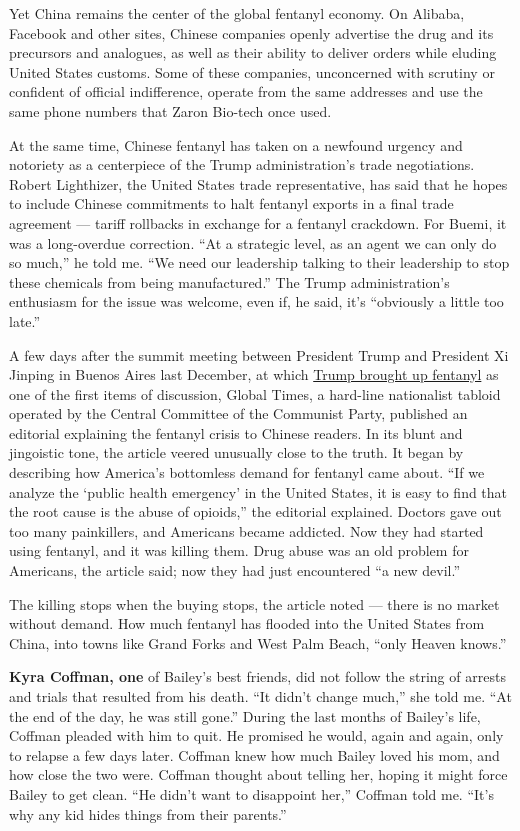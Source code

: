 Yet China remains the center of the global fentanyl economy. On Alibaba,
Facebook and other sites, Chinese companies openly advertise the drug
and its precursors and analogues, as well as their ability to deliver
orders while eluding United States customs. Some of these companies,
unconcerned with scrutiny or confident of official indifference, operate
from the same addresses and use the same phone numbers that Zaron
Bio-tech once used.

At the same time, Chinese fentanyl has taken on a newfound urgency and
notoriety as a centerpiece of the Trump administration's trade
negotiations. Robert Lighthizer, the United States trade representative,
has said that he hopes to include Chinese commitments to halt fentanyl
exports in a final trade agreement --- tariff rollbacks in exchange for
a fentanyl crackdown. For Buemi, it was a long-overdue correction. ``At
a strategic level, as an agent we can only do so much,'' he told me.
``We need our leadership talking to their leadership to stop these
chemicals from being manufactured.'' The Trump administration's
enthusiasm for the issue was welcome, even if, he said, it's ``obviously
a little too late.''

A few days after the summit meeting between President Trump and
President Xi Jinping in Buenos Aires last December, at which
\href{https://www.nytimes3xbfgragh.onion/2018/12/01/world/trump-xi-g20-merkel.html}{Trump
brought up fentanyl} as one of the first items of discussion, Global
Times, a hard-line nationalist tabloid operated by the Central Committee
of the Communist Party, published an editorial explaining the fentanyl
crisis to Chinese readers. In its blunt and jingoistic tone, the article
veered unusually close to the truth. It began by describing how
America's bottomless demand for fentanyl came about. ``If we analyze the
`public health emergency' in the United States, it is easy to find that
the root cause is the abuse of opioids,'' the editorial explained.
Doctors gave out too many painkillers, and Americans became addicted.
Now they had started using fentanyl, and it was killing them. Drug abuse
was an old problem for Americans, the article said; now they had just
encountered ``a new devil.''

The killing stops when the buying stops, the article noted --- there is
no market without demand. How much fentanyl has flooded into the United
States from China, into towns like Grand Forks and West Palm Beach,
``only Heaven knows.''

\textbf{Kyra Coffman, one} of Bailey's best friends, did not follow the
string of arrests and trials that resulted from his death. ``It didn't
change much,'' she told me. ``At the end of the day, he was still
gone.'' During the last months of Bailey's life, Coffman pleaded with
him to quit. He promised he would, again and again, only to relapse a
few days later. Coffman knew how much Bailey loved his mom, and how
close the two were. Coffman thought about telling her, hoping it might
force Bailey to get clean. ``He didn't want to disappoint her,'' Coffman
told me. ``It's why any kid hides things from their parents.''

